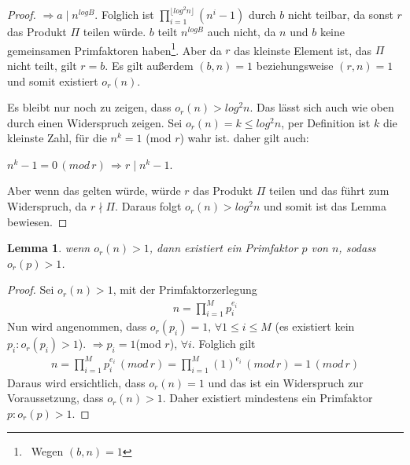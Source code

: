 \documentclass[12pt,oneside]{article}
\newtheorem{lemma}[theorem]{Lemma}
\theoremstyle{remark}
\theoremstyle{definition}
\begin{document}
\begin{proof}
$\Rightarrow a \mid n^{log B}$.\newline\newline
Folglich ist $\prod_{i = 1}^{\lfloor log^2 n \rfloor}(n^i - 1)$ durch $b$ nicht teilbar, da sonst $r$ das Produkt $\Pi$ teilen würde. $b$ teilt $n^{log B}$ auch nicht, da $n$ und $b$ keine gemeinsamen Primfaktoren haben\footnote{$ \,$ Wegen $(b,n) = 1$}. Aber da $r$ das kleinste Element ist, das $\Pi$ nicht teilt, gilt $r= b$. Es gilt außerdem $(b,n) = 1$ beziehungsweise $(r,n) = 1$ und somit existiert $o_{r}(n)$.\newline

Es bleibt nur noch zu zeigen, dass $o_{r}(n) > log^2 n$. Das lässt sich auch wie oben durch einen Widerspruch zeigen. Sei $o_{r}(n) = k \leq log^2 n$, per Definition ist $k$ die kleinste Zahl, für die $n^k = 1$ (mod $r$) wahr ist. daher gilt auch:\newline\newline
\centerline{$n^k - 1 = 0 \, (mod \, r) \, \Rightarrow r \mid n^k - 1$.}

Aber wenn das gelten würde, würde $r$ das Produkt $\Pi$ teilen und das führt zum Widerspruch, da $r \nmid \Pi$. Daraus folgt $o_{r}(n) > log^2 n$ und somit ist das Lemma bewiesen. 
\end{proof}

\smallskip

\begin{lemma}\label{ord_prime_l}
wenn $o_{r}(n) > 1$, dann existiert ein Primfaktor $p$ von $n$, sodass $o_{r}(p) > 1$. 
\end{lemma}
\begin{proof}
Sei $o_{r}(n) > 1$, mit der Primfaktorzerlegung
\begin{align*}
    n = \prod_{i = 1}^{M} p_{i}^{e_{i}}
\end{align*}
Nun wird angenommen, dass $o_{r}(p_{i}) = 1, \, \forall 1 \leq i \leq M$ (es existiert kein $p_{i} : o_{r}(p_{i}) > 1$).\newline\newline
$\Rightarrow p_{i} = 1 $(mod $r$), $\forall i$. Folglich gilt
\begin{align*}
    n = \prod_{i = 1} ^{M} p_{i}^{e_{i}} \, (mod \, r) = \prod_{i = 1} ^{M}(1)^{e_{i}} \,  (mod \, r) = 1 \, (mod \, r)
\end{align*}
\newline\newline Daraus wird ersichtlich, dass $o_{r}(n) = 1$ und das ist ein Widerspruch zur Voraussetzung, dass $o_{r}(n) > 1$. Daher existiert mindestens ein Primfaktor $p : o_{r}(p) > 1$.  
\end{proof}
\end{document}
